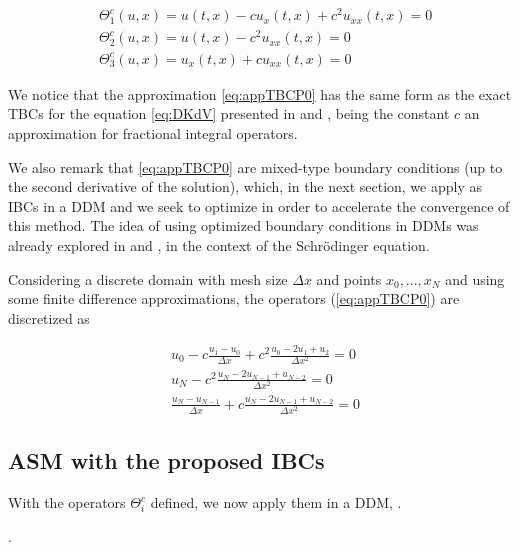 \begin{align}
  \label{eq:appTBCP0}
        &\Theta_1^{c}(u,x) = u(t,x) - c u_x(t,x)  + c^2  u_{xx}(t,x) = 0 \\
        &\Theta_2^{c}(u,x) =  u(t,x) - c^2    u_{xx}(t,x) = 0\\
        &\Theta_3^{c} (u,x)= u_x(t,x) + c u_{xx}(t,x)  = 0
\end{align}

\indent We notice that the approximation \eqref{eq:appTBCP0} has the same form as the exact TBCs for the equation \eqref{eq:DKdV} presented in \cite{zheng2008} and \cite{besse2015}, being the constant $c$ an approximation for fractional integral operators. 

\indent We also remark that \eqref{eq:appTBCP0} are mixed-type boundary conditions (up to the second derivative of the solution), which, in the next section, we apply as IBCs in a DDM and we seek to optimize in order to accelerate the convergence of this method. The idea of using optimized boundary conditions in DDMs was already explored in \cite{Halpern2008} and \cite{besse2017}, in the context of the Schrödinger equation.

\indent Considering a discrete domain with mesh size $\Delta x$ and points $x_0, ..., x_N$ and using some finite difference approximations, the operators (\ref{eq:appTBCP0}) are discretized as

\begin{align}
\label{eq:appDiscTBCP0}
        &u_0 - c \frac{u_1 - u_0}{\Delta x}  + c^2  \frac{u_0 -2u_1 + u_2}{\Delta x^2} = 0 \\
        &u_N - c^2    \frac{u_N -2u_{N-1} + u_{N-2}}{\Delta x^2} = 0 \\
        &\frac{u_N - u_{N-1}}{\Delta x}  + c    \frac{u_N -2u_{N-1} + u_{N-2}}{\Delta x^2} = 0 
\end{align}



\subsection{ASM with the proposed IBCs }

\indent With the operators $\Theta_i^c$ defined, we now apply them in a DDM, .

\indent {}.

